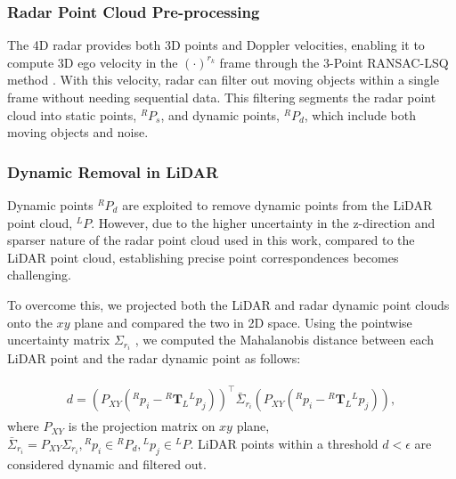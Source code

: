 \subsubsection{Radar Point Cloud Pre-processing}
The 4D radar provides both 3D points and Doppler velocities, enabling it to compute 3D ego velocity in the $\left ( \cdot  \right )^{r_k}$ frame through the 3-Point RANSAC-LSQ method \cite{ekf-radar}. With this velocity, radar can filter out moving objects within a single frame without needing sequential data. 
This filtering segments the radar point cloud into static points, ${}^RP_s$, and dynamic points, ${}^RP_d$, which include both moving objects and noise.

\subsubsection{Dynamic Removal in LiDAR}
Dynamic points ${}^RP_d$ are exploited to remove dynamic points from the \ac{LiDAR} point cloud, ${}^LP$. However, due to the higher uncertainty in the z-direction and sparser nature of the radar point cloud used in this work, compared to the \ac{LiDAR} point cloud, establishing precise point correspondences becomes challenging.

To overcome this, we projected both the \ac{LiDAR} and radar dynamic point clouds onto the $xy$ plane and compared the two in 2D space. Using the pointwise uncertainty matrix $\Sigma_{r_{i}}$ \cite{4DRadarSLAM}, we computed the Mahalanobis distance between each \ac{LiDAR} point and the radar dynamic point as follows:

\vspace{-3mm} \small
\begin{eqnarray}
\begin{aligned}
    \label{eq:lidar_dynamic}
    d=(P_{XY}({}^Rp_i-{}^R\textbf{T}_L{}^Lp_j))^\top\bar{\Sigma}_{r_i}(P_{XY}({}^Rp_i-{}^R\textbf{T}_L{}^Lp_j)),
\end{aligned}
\end{eqnarray}
\normalsize
where $P_{XY}$ is the projection matrix on $xy$ plane, $\bar{\Sigma}_{r_i} = P_{XY}\Sigma_{r_i}, {}^Rp_i\in{}^RP_d, {}^Lp_j\in{}^LP$. \ac{LiDAR} points within a threshold $d<\epsilon$ are considered dynamic and filtered out.

